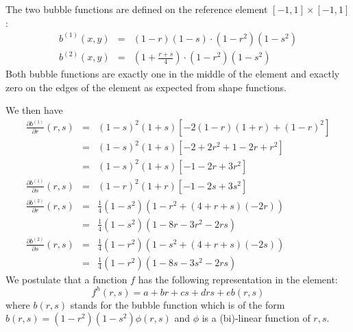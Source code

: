 The two bubble functions are defined on the reference element $[-1,1]\times [-1,1]$:
\begin{eqnarray}
b^{(1)}(x,y) &=&  (1-r)(1-s)\cdot (1-r^2) (1-s^2) \\  
b^{(2)}(x,y) &=&  \left(1+\frac{r+s}{4}\right) \cdot (1-r^2) (1-s^2) 
\end{eqnarray}
Both bubble functions are exactly one in the middle of the element and exactly zero on the edges
of the element as expected from shape functions.



We then have
\begin{eqnarray}
\frac{\partial b^{(1)}}{\partial r}(r,s) 
&=& (1-s)^2(1+s)[-2(1-r)(1+r)+(1-r)^2]\\
&=& (1-s)^2(1+s)[-2+2r^2 + 1-2r+r^2]\\
&=& (1-s)^2(1+s)[-1-2r+3r^2]\\
\frac{\partial b^{(1)}}{\partial s}(r,s) 
&=& (1-r)^2(1+r)[-1-2s+3s^2 ] \\
\frac{\partial b^{(2)}}{\partial r}(r,s) 
&=& \frac{1}{4} (1-s^2) (1-r^2 + (4+r+s) (-2r)) \\
&=& \frac{1}{4} (1-s^2) (1-8r-3r^2 -2rs) \\
\frac{\partial b^{(2)}}{\partial s}(r,s) 
&=& \frac{1}{4} (1-r^2) (1-s^2 + (4+r+s) (-2s)) \\
&=& \frac{1}{4} (1-r^2) (1-8s-3s^2 -2rs) 
\end{eqnarray}
We postulate that a function $f$ has the following representation 
in the element:
\[
f^h(r,s)=a+br+cs+drs+e b(r,s) 
\]
where $b(r,s)$ stands for the bubble function which is of the form $b(r,s)=(1-r^2)(1-s^2)\phi(r,s)$
and $\phi$ is a (bi)-linear function of $r,s$.

